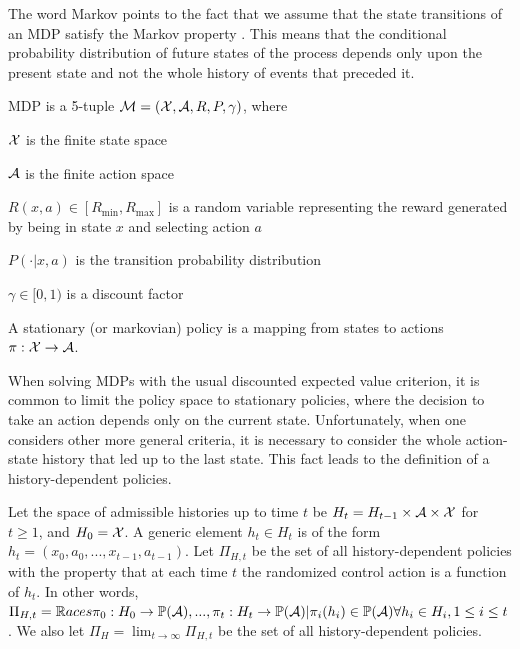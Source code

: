 The word Markov points to the fact that we assume that the state transitions of an MDP satisfy the Markov property \cite{???}. This means that the conditional probability distribution of future states of the process depends only upon the present state and not the whole history of events that preceded it.

\begin{definition}

MDP is a 5-tuple $\mathcal{M} = (\mathcal{X}, \mathcal{A}, R, P, \gamma)$, where 

$\mathcal{X}$ is the finite state space

$\mathcal{A}$ is the finite action space

$R(x, a) \in [R_{\min}, R_{\max}]$ is a random variable representing the reward generated by being in state $x$ and selecting action $a$

$P(\cdot|x, a)$ is the transition probability distribution

$\gamma \in [0, 1)$ is a discount factor
\end{definition}

\begin{definition}
A stationary (or markovian) policy is a mapping from states to actions $\pi:\mathcal{X} \to \mathcal{A}$.
\end{definition}

When solving MDPs with the usual discounted expected value criterion, it is common to limit the policy space to stationary policies, where the decision to take an action depends only on the current state. Unfortunately, when one considers other more general criteria, it is necessary to consider the whole action-state history that led up to the last state. This fact leads to the definition of a history-dependent policies.

\begin{definition}
Let the space of admissible histories up to time $t$ be $H_t = H_{t-1} \times \mathcal{A} \times \mathcal{X}$ for $t \ge 1$, and $H_0 = \mathcal{X}$. A generic element $h_t \in H_t$ is of the form $h_t = (x_0, a_0, ..., x_{t-1}, a_{t-1})$. Let $\Pi_{H,t}$ be the set of all history-dependent policies with the property that at each time $t$ the randomized control action is a function of $h_t$. In other words, 
$\Pi_{H,t} = \mathbb{R}aces{\pi_0: H_0 \to \mathbb{P}(\mathcal{A}), ..., \pi_t: H_t \to \mathbb{P}(\mathcal{A})|\pi_i(h_i) \in \mathbb{P}(\mathcal{A}) \forall h_i \in H_i, 1\le i\le t}$. We also let $\Pi_H = \lim_{t\to\infty}\Pi_{H,t}$ be the set of all history-dependent policies.
\end{definition}

